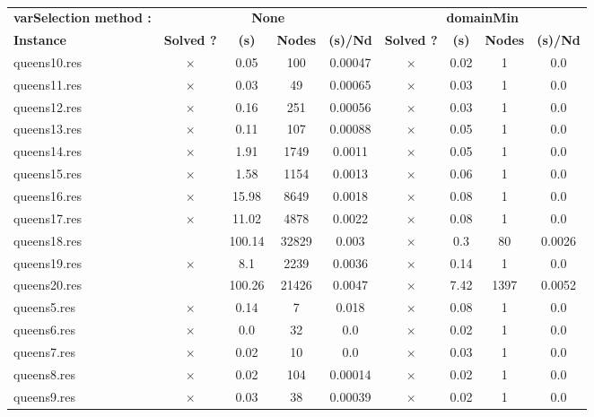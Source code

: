 \documentclass[main.tex]{subfiles}
\begin{document}
\thispagestyle{empty}

\begin{landscape}
\begin{center}
\begin{table}[h]
\centering
\caption{}
\label{}
\renewcommand{\arraystretch}{1.4} 
\begin{tabular}{|l|cccc|cccc|}
	\hline
\textbf{varSelection method :} & \multicolumn{4}{c}{\textbf{None}} & \multicolumn{4}{c}{\textbf{domainMin}}\\
\textbf{Instance}  & \textbf{Solved ?} & \textbf{(s)} & \textbf{Nodes} & \textbf{(s)/Nd} & \textbf{Solved ?} & \textbf{(s)} & \textbf{Nodes} & \textbf{(s)/Nd}\\\hline

queens10.res & $\times$ & 0.05 & 100 & 0.00047
 & $\times$ & 0.02 & 1 & 0.0
\\
queens11.res & $\times$ & 0.03 & 49 & 0.00065
 & $\times$ & 0.03 & 1 & 0.0
\\
queens12.res & $\times$ & 0.16 & 251 & 0.00056
 & $\times$ & 0.03 & 1 & 0.0
\\
queens13.res & $\times$ & 0.11 & 107 & 0.00088
 & $\times$ & 0.05 & 1 & 0.0
\\
queens14.res & $\times$ & 1.91 & 1749 & 0.0011
 & $\times$ & 0.05 & 1 & 0.0
\\
queens15.res & $\times$ & 1.58 & 1154 & 0.0013
 & $\times$ & 0.06 & 1 & 0.0
\\
queens16.res & $\times$ & 15.98 & 8649 & 0.0018
 & $\times$ & 0.08 & 1 & 0.0
\\
queens17.res & $\times$ & 11.02 & 4878 & 0.0022
 & $\times$ & 0.08 & 1 & 0.0
\\
queens18.res &  & 100.14 & 32829 & 0.003
 & $\times$ & 0.3 & 80 & 0.0026
\\
queens19.res & $\times$ & 8.1 & 2239 & 0.0036
 & $\times$ & 0.14 & 1 & 0.0
\\
queens20.res &  & 100.26 & 21426 & 0.0047
 & $\times$ & 7.42 & 1397 & 0.0052
\\
queens5.res & $\times$ & 0.14 & 7 & 0.018
 & $\times$ & 0.08 & 1 & 0.0
\\
queens6.res & $\times$ & 0.0 & 32 & 0.0
 & $\times$ & 0.02 & 1 & 0.0
\\
queens7.res & $\times$ & 0.02 & 10 & 0.0
 & $\times$ & 0.03 & 1 & 0.0
\\
queens8.res & $\times$ & 0.02 & 104 & 0.00014
 & $\times$ & 0.02 & 1 & 0.0
\\
queens9.res & $\times$ & 0.03 & 38 & 0.00039
 & $\times$ & 0.02 & 1 & 0.0

\end{tabular}
\end{table}
\end{center}
\end{landscape}
\end{document}
